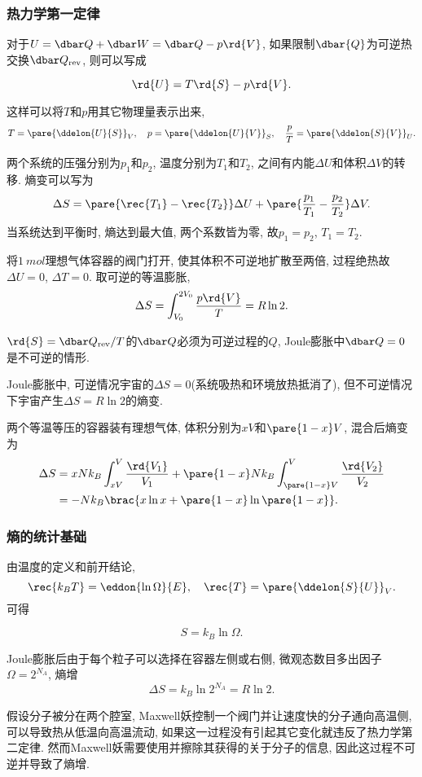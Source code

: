 \documentclass[../Thermal.tex]{subfiles}
\begin{document}
\subsubsection{热力学第一定律}
对于$U=\dbar Q + \dbar W = \dbar Q - p\rd{V}$, 如果限制$\dbar{Q}$为可逆热交换$\dbar Q_{\text{rev}}$, 则可以写成
\begin{finale}
\[ \rd{U} = T \rd{S} - p \rd{V}. \]
\end{finale}
这样可以将$T$和$p$用其它物理量表示出来,
\[ T = \pare{\ddelon{U}{S}}_V,\quad p = \pare{\ddelon{U}{V}}_S,\quad \frac{p}{T} = \pare{\ddelon{S}{V}}_U. \]
\begin{ex}
\label{ex:transofp}
两个系统的压强分别为$p_1$和$p_2$, 温度分别为$T_1$和$T_2$, 之间有内能$\Delta U$和体积$\Delta V$的转移. 熵变可以写为
\[ \Delta S = \pare{\rec{T_1} - \rec{T_2}}\Delta U + \pare{\frac{p_1}{T_1} - \frac{p_2}{T_2}}\Delta V. \]
当系统达到平衡时, 熵达到最大值, 两个系数皆为零, 故$p_1 = p_2$, $T_1 = T_2$.
\end{ex}
\begin{ex}[Joule膨胀]
将$\SI{1}{mol}$理想气体容器的阀门打开, 使其体积不可逆地扩散至两倍, 过程绝热故$\Delta U = 0$, $\Delta T = 0$. 取可逆的等温膨胀,
\[ \Delta S = \int_{V_0}^{2V_0} \frac{p\rd{V}}{T} = R\ln 2. \]
\end{ex}
\begin{pitfall}
$\rd{S} = \dbar Q_{\mathrm{rev}}/T$的$\dbar Q$必须为可逆过程的$Q$, Joule膨胀中$\dbar Q=0$是不可逆的情形.
\end{pitfall}
\begin{ex}
Joule膨胀中, 可逆情况宇宙的$\Delta S = 0$(系统吸热和环境放热抵消了), 但不可逆情况下宇宙产生$\Delta S = R \ln 2$的熵变.
\end{ex}
\begin{ex}[混合熵]
两个等温等压的容器装有理想气体, 体积分别为$xV$和$\pare{1-x}V$, 混合后熵变为
\begin{align*}
\Delta S &= xNk_B\int_{xV}^V\frac{\rd{V_1}}{V_1} + \pare{1-x}Nk_B\int_{\pare{1-x}V}^V\frac{\rd{V_2}}{V_2}\\
&= -Nk_B\brac{x\ln x+\pare{1-x}\ln\pare{1-x}}.
\end{align*}
\end{ex}
\subsubsection{熵的统计基础}
由温度的定义和前开结论,
\[ \rec{k_BT} = \eddon{\ln\Omega}{E},\quad \rec{T} = \pare{\ddelon{S}{U}}_V. \]
可得
\begin{finale}
\[ S = k_B \ln\Omega. \]
\end{finale}
\begin{ex}[Joule膨胀]
Joule膨胀后由于每个粒子可以选择在容器左侧或右侧, 微观态数目多出因子$\Omega = 2^{N_A}$, 熵增
\[ \Delta S = k_B \ln 2^{N_A} = R \ln 2. \]
\end{ex}
\begin{ex}[Maxwell妖]
假设分子被分在两个腔室, Maxwell妖控制一个阀门并让速度快的分子通向高温侧, 可以导致热从低温向高温流动, 如果这一过程没有引起其它变化就违反了热力学第二定律. 然而Maxwell妖需要使用并擦除其获得的关于分子的信息, 因此这过程不可逆并导致了熵增.
\end{ex}
\end{document}
